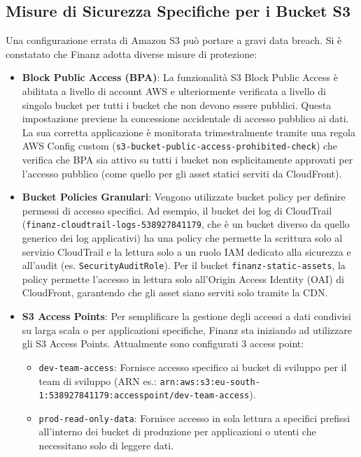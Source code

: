 \subsection{Misure di Sicurezza Specifiche per i Bucket S3}
\label{subsec:s3-security_cap2}
Una configurazione errata di Amazon S3 può portare a gravi data breach. Si è constatato che Finanz adotta diverse misure di protezione:
\begin{itemize}
    \item \textbf{Block Public Access (BPA)}: La funzionalità S3 Block Public Access è abilitata a livello di account AWS e ulteriormente verificata a livello di singolo bucket per tutti i bucket che non devono essere pubblici. Questa impostazione previene la concessione accidentale di accesso pubblico ai dati. La sua corretta applicazione è monitorata trimestralmente tramite una regola AWS Config custom (\texttt{s3-bucket-public-access-prohibited-check}) che verifica che BPA sia attivo su tutti i bucket non esplicitamente approvati per l'accesso pubblico (come quello per gli asset statici serviti da CloudFront).
    \item \textbf{Bucket Policies Granulari}: Vengono utilizzate bucket policy per definire permessi di accesso specifici. Ad esempio, il bucket dei log di CloudTrail (\texttt{finanz-cloudtrail-logs-538927841179}, che è un bucket diverso da quello generico dei log applicativi) ha una policy che permette la scrittura solo al servizio CloudTrail e la lettura solo a un ruolo IAM dedicato alla sicurezza e all'audit (es. \texttt{SecurityAuditRole}). Per il bucket \texttt{finanz-static-assets}, la policy permette l'accesso in lettura solo all'Origin Access Identity (OAI) di CloudFront, garantendo che gli asset siano serviti solo tramite la CDN.
    \item \textbf{S3 Access Points}: Per semplificare la gestione degli accessi a dati condivisi su larga scala o per applicazioni specifiche, Finanz sta iniziando ad utilizzare gli S3 Access Points. Attualmente sono configurati 3 access point:
        \begin{itemize}
            \item \texttt{dev-team-access}: Fornisce accesso specifico ai bucket di sviluppo per il team di sviluppo (ARN es.: \texttt{arn:aws:s3:eu-south-1:538927841179:accesspoint/dev-team-access}).
            \item \texttt{prod-read-only-data}: Fornisce accesso in sola lettura a specifici prefissi all'interno dei bucket di produzione per applicazioni o utenti che necessitano solo di leggere dati.

\end{itemize}
\end{itemize}
